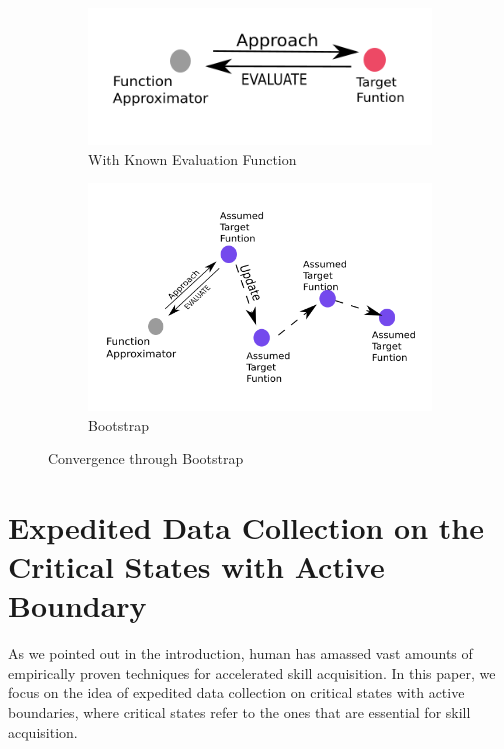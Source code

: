 \documentclass[journal]{IEEEtran}
\begin{document}
\begin{figure}
\centering
\begin{subfigure}{0.25\textwidth}
  \centering
  \includegraphics[width=\linewidth]{onego.png}
  \caption{With Known Evaluation Function}
\end{subfigure}%
\begin{subfigure}{.25\textwidth}
  \centering
  \includegraphics[width=\linewidth]{bootstrap.png}
  \caption{Bootstrap}
\end{subfigure}
\caption{Convergence through Bootstrap}
\label{fig:bootstrap}
\end{figure}


\section{Expedited Data Collection on the Critical States with Active Boundary}
As we pointed out in the introduction, human has amassed vast amounts of empirically proven techniques for accelerated skill acquisition. In this paper, we focus on the idea of expedited data collection on critical states with active boundaries, where critical states refer to the ones that are essential for skill acquisition.
\end{document}
